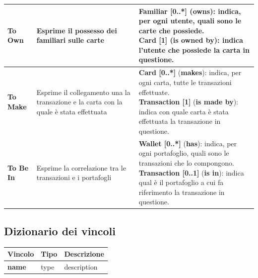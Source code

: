 \begin{longtable}{m{2.7cm}|m{4cm}|m{7cm}}
    \raggedright \textbf{To Own} & \raggedright Esprime il possesso dei familiari sulle carte &
    \parbox{7cm}{
        \textbf{Familiar [0..*]} (\textbf{owns}): indica, per ogni utente, quali sono le carte che possiede. \\
        \textbf{Card [1]} (\textbf{is owned by}): indica l'utente che possiede la carta in questione.
    } \\ \hline

    \raggedright \textbf{To Make} & \raggedright Esprime il collegamento una la transazione e la carta con la quale è stata effettuata &
    \parbox{7cm}{
        \textbf{Card [0..*]} (\textbf{makes}): indica, per ogni carta, tutte le transazioni effettuate. \\
        \textbf{Transaction [1]} (\textbf{is made by}): indica con quale carta è stata effettuata la transazione in questione.
    } \\ \hline

    \raggedright \textbf{To Be In} & \raggedright Esprime la correlazione tra le transazioni e i portafogli &
    \parbox{7cm}{
        \textbf{Wallet [0..*]} (\textbf{has}): indica, per ogni portafoglio, quali sono le transazioni che lo compongono. \\
        \textbf{Transaction [0..1]} (\textbf{is in}): indica qual è il portafoglio a cui fa riferimento la transazione in questione.
    } \\ \hline

\end{longtable}

\subsection{Dizionario dei vincoli}

\begin{longtable}{m{2.7cm}|m{4cm}|m{7cm}}
    
    \rowcolor{black!10}
    \textbf{Vincolo} & \textbf{Tipo} & \textbf{Descrizione} \\ \hline
    \endhead

    \raggedright \textbf{name} & \raggedright type &
    description\\ \hline

\end{longtable}